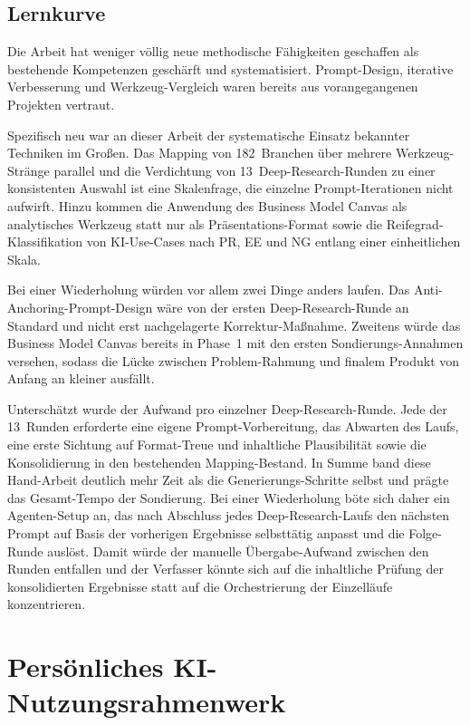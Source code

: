 \documentclass[a4paper,11pt]{article}
\begin{document}
\subsection{Lernkurve}

Die Arbeit hat weniger völlig neue methodische Fähigkeiten geschaffen
als bestehende Kompetenzen geschärft und systematisiert. Prompt-Design,
iterative Verbesserung und Werkzeug-Vergleich waren bereits aus
vorangegangenen Projekten vertraut.

Spezifisch neu war an dieser Arbeit der systematische Einsatz bekannter
Techniken im Großen. Das Mapping von 182~Branchen über mehrere
Werkzeug-Stränge parallel und die Verdichtung von 13~Deep-Research-Runden
zu einer konsistenten Auswahl ist eine Skalenfrage, die einzelne
Prompt-Iterationen nicht aufwirft. Hinzu kommen die Anwendung des
Business Model Canvas als analytisches Werkzeug statt nur als
Präsentations-Format sowie die Reifegrad-Klassifikation von KI-Use-Cases
nach PR, EE und NG entlang einer einheitlichen Skala.

Bei einer Wiederholung würden vor allem zwei Dinge anders laufen. Das
Anti-Anchoring-Prompt-Design wäre von der ersten Deep-Research-Runde an
Standard und nicht erst nachgelagerte Korrektur-Maßnahme. Zweitens
würde das Business Model Canvas bereits in Phase~1 mit den ersten
Sondierungs-Annahmen versehen, sodass die Lücke zwischen Problem-Rahmung
und finalem Produkt von Anfang an kleiner ausfällt.

Unterschätzt wurde der Aufwand pro einzelner Deep-Research-Runde. Jede
der 13~Runden erforderte eine eigene Prompt-Vorbereitung, das Abwarten
des Laufs, eine erste Sichtung auf Format-Treue und inhaltliche
Plausibilität sowie die Konsolidierung in den bestehenden
Mapping-Bestand. In Summe band diese Hand-Arbeit deutlich mehr Zeit
als die Generierungs-Schritte selbst und prägte das Gesamt-Tempo der
Sondierung. Bei einer Wiederholung böte sich daher ein Agenten-Setup
an, das nach Abschluss jedes Deep-Research-Laufs den nächsten Prompt
auf Basis der vorherigen Ergebnisse selbsttätig anpasst und die Folge-Runde
auslöst. Damit würde der manuelle Übergabe-Aufwand zwischen den Runden
entfallen und der Verfasser könnte sich auf die inhaltliche Prüfung der
konsolidierten Ergebnisse statt auf die Orchestrierung der Einzelläufe
konzentrieren.

\section{Persönliches KI-Nutzungsrahmenwerk}
\end{document}
